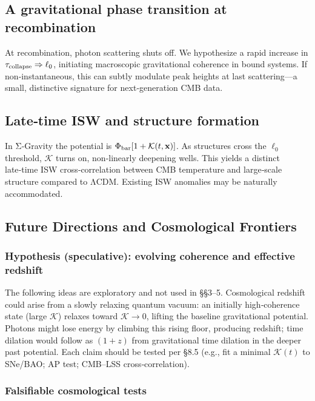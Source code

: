 \documentclass[11pt,a4paper]{article}
\begin{document}
\subsection{A gravitational phase transition at recombination}


At recombination, photon scattering shuts off. We hypothesize a rapid increase in $\tau_{\rm collapse}\Rightarrow\ell_0$, initiating macroscopic gravitational coherence in bound systems. If non‑instantaneous, this can subtly modulate peak heights at last scattering—a small, distinctive signature for next‑generation CMB data.


\subsection{Late‑time ISW and structure formation}


In Σ‑Gravity the potential is $\Phi_{\rm bar}[1+\mathcal{K}(t,\mathbf{x})]$. As structures cross the $\ell_0$ threshold, $\mathcal{K}$ turns on, non‑linearly deepening wells. This yields a distinct late‑time ISW cross‑correlation between CMB temperature and large‑scale structure compared to ΛCDM. Existing ISW anomalies may be naturally accommodated.


\subsection{Future Directions and Cosmological Frontiers}


\subsubsection{Hypothesis (speculative): evolving coherence and effective redshift}


The following ideas are exploratory and not used in §§3–5. Cosmological redshift could arise from a slowly relaxing quantum vacuum: an initially high‑coherence state (large $\mathcal{K}$) relaxes toward $\mathcal{K}\to0$, lifting the baseline gravitational potential. Photons might lose energy by climbing this rising floor, producing redshift; time dilation would follow as $(1+z)$ from gravitational time dilation in the deeper past potential. Each claim should be tested per §8.5 (e.g., fit a minimal $\mathcal{K}(t)$ to SNe/BAO; AP test; CMB–LSS cross‑correlation).


\subsubsection{Falsifiable cosmological tests}
\end{document}
